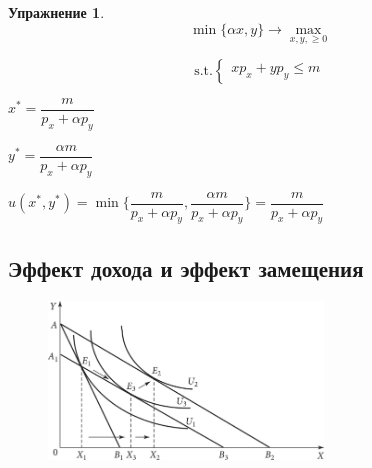 \documentclass[reqno]{article}
\theoremstyle{definition}
\theoremstyle{definition}
\theoremstyle{definition}
\theoremstyle{definition}
\theoremstyle{definition}
\newtheorem{exc}{Упражнение}[section]
\theoremstyle{definition}
\theoremstyle{definition}
\theoremstyle{definition}
\theoremstyle{definition}
\begin{document}
	\begin{exc}
		$$\min\{\alpha x,y\} \rightarrow \max\limits_{x,y,\geq 0}$$
		
		$$
		\text{s.t.}
		\begin{cases}
			x p_x+y p_y \leq m
		\end{cases}
		$$
		
		$x^* = \dfrac{m}{p_x + \alpha p_y}$
		
		$y^* = \dfrac{\alpha m}{p_x + \alpha p_y}$
		
		$ u(x^*,y^*)=\min\{\dfrac{m}{p_x + \alpha p_y},\dfrac{\alpha m}{p_x + \alpha p_y}\} = \dfrac{m}{p_x + \alpha p_y}$
	\end{exc}
	
	\subsection{Эффект дохода и эффект замещения}
	
	\begin{figure}[h!]
		\centering
		\includegraphics[width=0.65\textwidth]{ЭффектДоходаИЗамещения}
	\end{figure}
\end{document}
